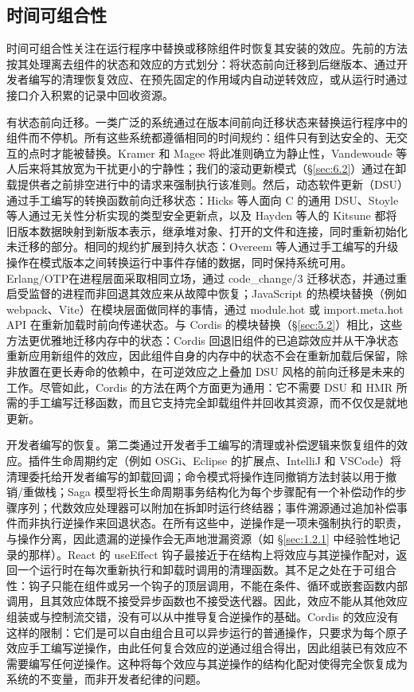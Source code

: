 \subsection{时间可组合性}
\label{sec:7.3}

时间可组合性关注在运行程序中替换或移除组件时恢复其安装的效应。先前的方法按其处理离去组件的状态和效应的方式划分：将状态前向迁移到后继版本、通过开发者编写的清理恢复效应、在预先固定的作用域内自动逆转效应，或从运行时通过接口介入积累的记录中回收资源。

有状态前向迁移。一类广泛的系统通过在版本间前向迁移状态来替换运行程序中的组件而不停机。所有这些系统都遵循相同的时间规约：组件只有到达安全的、无交互的点时才能被替换。Kramer 和 Magee 将此准则确立为静止性\cite{ref51}，Vandewoude 等人后来将其放宽为干扰更小的宁静性\cite{ref52}；我们的滚动更新模式（\S\ref{sec:6.2}）通过在卸载提供者之前排空进行中的请求来强制执行该准则。然后，动态软件更新（DSU）通过手工编写的转换函数前向迁移状态：Hicks 等人面向 C 的通用 DSU\cite{ref99}、Stoyle 等人通过无关性分析实现的类型安全更新点\cite{ref100}，以及 Hayden 等人的 Kitsune\cite{ref101} 都将旧版本数据映射到新版本表示，继承堆对象、打开的文件和连接，同时重新初始化未迁移的部分。相同的规约扩展到持久状态：Overeem 等人\cite{ref102}通过手工编写的升级操作在模式版本之间转换运行中事件存储的数据，同时保持系统可用。Erlang/OTP\cite{ref15}在进程层面采取相同立场，通过 code\_change/3 迁移状态，并通过重启受监督的进程而非回退其效应来从故障中恢复；JavaScript 的热模块替换（例如 webpack\cite{ref46}、Vite\cite{ref47}）在模块层面做同样的事情，通过 module.hot 或 import.meta.hot API 在重新加载时前向传递状态。与 Cordis 的模块替换（\S\ref{sec:5.2}）相比，这些方法更优雅地迁移内存中的状态：Cordis 回退旧组件的已追踪效应并从干净状态重新应用新组件的效应，因此组件自身的内存中的状态不会在重新加载后保留，除非放置在更长寿命的依赖中，在可逆效应之上叠加 DSU 风格的前向迁移是未来的工作。尽管如此，Cordis 的方法在两个方面更为通用：它不需要 DSU 和 HMR 所需的手工编写迁移函数，而且它支持完全卸载组件并回收其资源，而不仅仅是就地更新。

开发者编写的恢复。第二类通过开发者手工编写的清理或补偿逻辑来恢复组件的效应。插件生命周期约定（例如 OSGi\cite{ref50}、Eclipse 的扩展点、IntelliJ 和 VSCode）将清理委托给开发者编写的卸载回调；命令模式\cite{ref103}将操作连同撤销方法封装以用于撤销/重做栈；Saga 模型\cite{ref49}将长生命周期事务结构化为每个步骤配有一个补偿动作的步骤序列；代数效应处理器可以附加在拆卸时运行终结器\cite{ref104}；事件溯源\cite{ref105}通过追加补偿事件而非执行逆操作来回退状态。在所有这些中，逆操作是一项未强制执行的职责，与操作分离，因此遗漏的逆操作会无声地泄漏资源（如 \S\ref{sec:1.2.1} 中经验性地记录的那样）。React 的 useEffect 钩子\cite{ref106}最接近于在结构上将效应与其逆操作配对，返回一个运行时在每次重新执行和卸载时调用的清理函数。其不足之处在于可组合性：钩子只能在组件或另一个钩子的顶层调用，不能在条件、循环或嵌套函数内部调用，且其效应体既不接受异步函数也不接受迭代器。因此，效应不能从其他效应组装或与控制流交错，没有可以从中推导复合逆操作的基础。Cordis 的效应没有这样的限制：它们是可以自由组合且可以异步运行的普通操作，只要求为每个原子效应手工编写逆操作，由此任何复合效应的逆通过组合得出，因此组装已有效应不需要编写任何逆操作。这种将每个效应与其逆操作的结构化配对使得完全恢复成为系统的不变量，而非开发者纪律的问题。

